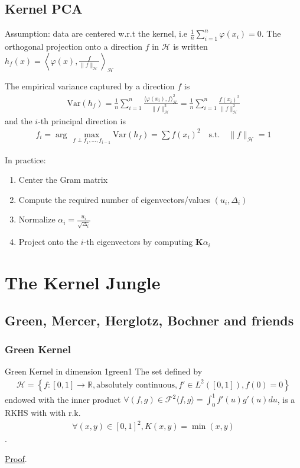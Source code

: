 \documentclass[10pt]{article}
\begin{document}
\subsection{Kernel PCA}
Assumption: data are centered w.r.t the kernel, i.e $ \frac{1}{n}\sum_{i=1}^n
\varphi(x_i) = 0$.
The orthogonal projection onto a direction $f$ in $\mathcal{H}$ is written 
$h_f(x) = \left\langle \varphi(x), \frac{f}{\lVert f\rVert_\mathcal{H}} 
\right\rangle_\mathcal{H}$

The empirical variance captured by a direction $f$ is 
\begin{align*}
  \text{Var}(h_f) = \frac{1}{n}\sum_{i=1}^n\frac{\langle \varphi(x_i), f 
  \rangle^2_\mathcal{H}}{\lVert f\rVert_\mathcal{H}^2} = 
  \frac{1}{n}\sum_{i=1}^n\frac{f(x_i)^2}{\lVert f\rVert_\mathcal{H}^2}
\end{align*}
and the $i$-th principal direction is 
\begin{align*}
  f_i = \arg\,\max_{f \perp {f_1, ..., f_{i-1}}} \text{Var}(h_f) = 
  \sum f(x_i)^2
   \quad 
  \text{s.t.}  \quad \lVert f\rVert_\mathcal{H} = 1
\end{align*}

In practice: 
\begin{enumerate}
  \item Center the Gram matrix
  \item Compute the required number of eigenvectors/values $(u_i, \Delta_i)$
  \item Normalize $\alpha_i = \frac{u_i}{\sqrt{\Delta_i}}$
  \item Project onto the $i$-th eigenvectors by computing $\mathbf{K}\alpha_i$
\end{enumerate}

\section{The Kernel Jungle}

\subsection{Green, Mercer, Herglotz, Bochner and friends}

\subsubsection{Green Kernel}

\begin{Theorem}{Green Kernel in dimension 1}{green1}
  The set defined by
  \begin{align*}
    \mathcal{H} = \left\{f: [0, 1] \rightarrow \mathbb{R}, \text{absolutely 
    continuous}, f' \in L^2([0, 1]), f(0) = 0 \right\}
  \end{align*}
  endowed with the inner product $\forall (f, g) \in \mathcal{F}^2 \langle f, g
  \rangle = \int_0^1 f'(u)g'(u)du$, 
  is a RKHS with with r.k.
  \begin{align*}
    \forall (x, y) \in [0, 1]^2, K(x, y) = \min(x, y)
  \end{align*}.
  \par \hfill \hyperref[prf:green1]{\small Proof}.
\end{Theorem}
\end{document}
